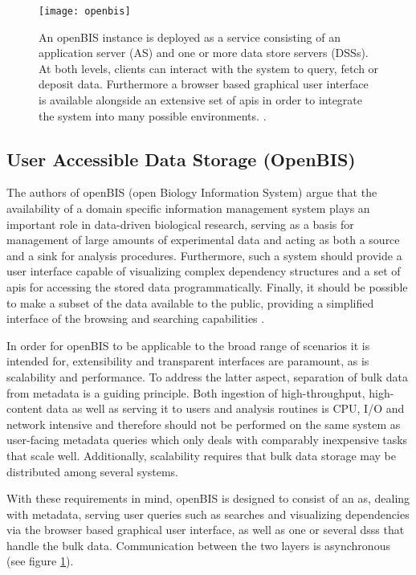 \begin{figure}
  \centering
  \texttt{[image: openbis]}
  \caption[Overview of the openBIS architecture and a more in-depth look at the data storage implementation.]{An openBIS instance is deployed as a service consisting of an application server (AS) and one or more data store servers (DSSs). At both levels, clients can interact with the system to query, fetch or deposit data. Furthermore a browser based graphical user interface is available alongside an extensive set of \glspl{api} in order to integrate the system into many possible environments. \citep{Bauch2011}.}
  \label{fig:openbis}
\end{figure}

\subsection{User Accessible Data Storage (OpenBIS)}
The authors of openBIS (open Biology Information System) argue that the availability of a domain specific information management system plays an important role in data-driven biological research, serving as a basis for management of large amounts of experimental data and acting as both a source and a sink for analysis procedures. Furthermore, such a system should provide a user interface capable of visualizing complex dependency structures and a set of \glspl{api} for accessing the stored data programmatically. Finally, it should be possible to make a subset of the data available to the public, providing a simplified interface of the browsing and searching capabilities \citep{Bauch2011}.

In order for openBIS to be applicable to the broad range of scenarios it is intended for, extensibility and transparent interfaces are paramount, as is scalability and performance. To address the latter aspect, separation of bulk data from metadata is a guiding principle. Both ingestion of high-throughput, high-content data as well as serving it to users and analysis routines is CPU, I/O and network intensive and therefore should not be performed on the same system as user-facing metadata queries which only deals with comparably inexpensive tasks that scale well. Additionally, scalability requires that bulk data storage may be distributed among several systems.

With these requirements in mind, openBIS is designed to consist of an \gls{as}, dealing with metadata, serving user queries such as searches and visualizing dependencies via the browser based graphical user interface, as well as one or several \glspl{dss} that handle the bulk data. Communication between the two layers is asynchronous (see figure \ref{fig:openbis}).

